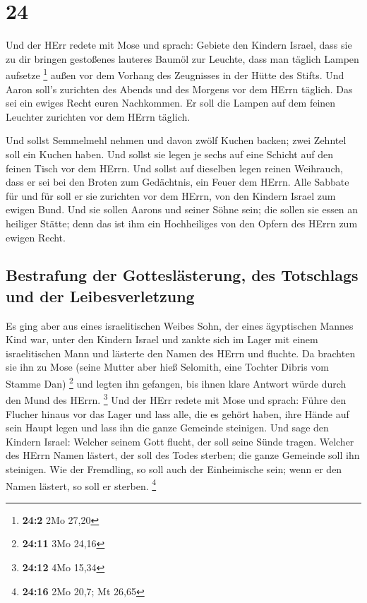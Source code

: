 \hypertarget{section-23}{%
\section{24}\label{section-23}}

 Und der HErr redete mit Mose und sprach: 
Gebiete den Kindern Israel, dass sie zu dir bringen gestoßenes lauteres
Baumöl zur Leuchte, dass man täglich Lampen aufsetze \footnote{\textbf{24:2}
  2Mo 27,20}  außen vor dem Vorhang des Zeugnisses in der
Hütte des Stifts. Und Aaron soll's zurichten des Abends und des Morgens
vor dem HErrn täglich. Das sei ein ewiges Recht euren Nachkommen.
 Er soll die Lampen auf dem feinen Leuchter zurichten vor
dem HErrn täglich.

 Und sollst Semmelmehl nehmen und davon zwölf Kuchen
backen; zwei Zehntel soll ein Kuchen haben.  Und sollst
sie legen je sechs auf eine Schicht auf den feinen Tisch vor dem HErrn.
 Und sollst auf dieselben legen reinen Weihrauch, dass er
sei bei den Broten zum Gedächtnis, ein Feuer dem HErrn. 
Alle Sabbate für und für soll er sie zurichten vor dem HErrn, von den
Kindern Israel zum ewigen Bund.  Und sie sollen Aarons und
seiner Söhne sein; die sollen sie essen an heiliger Stätte; denn das ist
ihm ein Hochheiliges von den Opfern des HErrn zum ewigen Recht.

\hypertarget{bestrafung-der-gottesluxe4sterung-des-totschlags-und-der-leibesverletzung}{%
\subsection{Bestrafung der Gotteslästerung, des Totschlags und der
Leibesverletzung}\label{bestrafung-der-gottesluxe4sterung-des-totschlags-und-der-leibesverletzung}}

 Es ging aber aus eines israelitischen Weibes Sohn, der
eines ägyptischen Mannes Kind war, unter den Kindern Israel und zankte
sich im Lager mit einem israelitischen Mann  und lästerte
den Namen des HErrn und fluchte. Da brachten sie ihn zu Mose (seine
Mutter aber hieß Selomith, eine Tochter Dibris vom Stamme Dan)
\footnote{\textbf{24:11} 3Mo 24,16}  und legten ihn
gefangen, bis ihnen klare Antwort würde durch den Mund des HErrn.
\footnote{\textbf{24:12} 4Mo 15,34}  Und der HErr redete
mit Mose und sprach:  Führe den Flucher hinaus vor das
Lager und lass alle, die es gehört haben, ihre Hände auf sein Haupt
legen und lass ihn die ganze Gemeinde steinigen.  Und
sage den Kindern Israel: Welcher seinem Gott flucht, der soll seine
Sünde tragen.  Welcher des HErrn Namen lästert, der soll
des Todes sterben; die ganze Gemeinde soll ihn steinigen. Wie der
Fremdling, so soll auch der Einheimische sein; wenn er den Namen
lästert, so soll er sterben. \footnote{\textbf{24:16} 2Mo 20,7; Mt 26,65}

